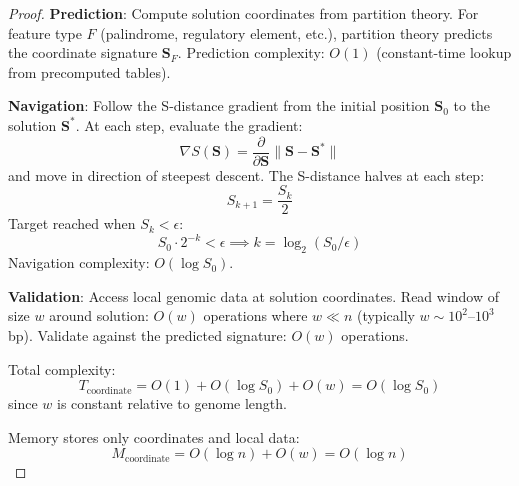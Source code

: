 \documentclass[11pt,a4paper]{article}
\theoremstyle{remark}
\newcommand{\Scoord}{\mathbf{S}}
\begin{document}
\begin{proof}
\textbf{Prediction}: Compute solution coordinates from partition theory. For feature type $F$ (palindrome, regulatory element, etc.), partition theory predicts the coordinate signature $\Scoord_F$. Prediction complexity: $O(1)$ (constant-time lookup from precomputed tables).

\textbf{Navigation}: Follow the S-distance gradient from the initial position $\Scoord_0$ to the solution $\Scoord^*$. At each step, evaluate the gradient:
\begin{equation}
\nabla S(\Scoord) = \frac{\partial}{\partial \Scoord}\|\Scoord - \Scoord^*\|
\end{equation}
and move in direction of steepest descent. The S-distance halves at each step:
\begin{equation}
S_{k+1} = \frac{S_k}{2}
\end{equation}
Target reached when $S_k < \epsilon$:
\begin{equation}
S_0 \cdot 2^{-k} < \epsilon \implies k = \log_2(S_0/\epsilon)
\end{equation}
Navigation complexity: $O(\log S_0)$.

\textbf{Validation}: Access local genomic data at solution coordinates. Read window of size $w$ around solution: $O(w)$ operations where $w \ll n$ (typically $w \sim 10^2$--$10^3$ bp). Validate against the predicted signature: $O(w)$ operations.

Total complexity:
\begin{equation}
T_{\text{coordinate}} = O(1) + O(\log S_0) + O(w) = O(\log S_0)
\end{equation}
since $w$ is constant relative to genome length.

Memory stores only coordinates and local data:
\begin{equation}
M_{\text{coordinate}} = O(\log n) + O(w) = O(\log n)
\end{equation}
\end{proof}
\end{document}
